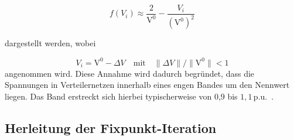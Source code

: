 \begin{equation}
	f(V_i) \approx \frac{2}{\mathrm{V}^0} - \frac{V_i}{(\mathrm{V}^0)^2}
	\label{eq:laurent_approx}
\end{equation}

dargestellt werden, wobei
 
\begin{equation}
	V_i = \mathrm{V}^0 - \Delta V \quad \text{mit} \quad \|\Delta V\| / \|\mathrm{V}^0\| < 1
	\label{eq:annahme}
\end{equation}
 angenommen wird.
Diese Annahme wird dadurch begründet, dass die Spannungen in Verteilernetzen innerhalb eines engen Bandes um den Nennwert liegen. 
Das Band erstreckt sich hierbei typischerweise von 0,9 bis $1,1\,\mathrm{p.u.}$~\cite{Giraldo2022}.

\subsection{Herleitung der Fixpunkt-Iteration}
\label{subsec:fpi_herleitung}

